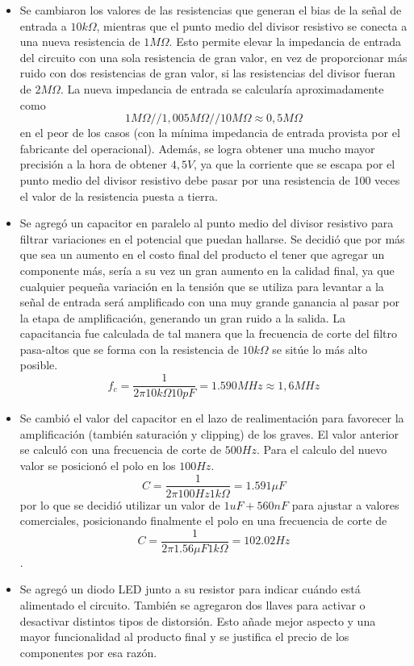\begin{itemize}
\item Se cambiaron los valores de las resistencias que generan el bias de la señal de entrada a $10k\Omega$, mientras que el punto medio del divisor resistivo se conecta a una nueva resistencia de $1M\Omega$. Esto permite elevar la impedancia de entrada del circuito con una sola resistencia de gran valor, en vez de proporcionar más ruido con dos resistencias de gran valor, si las resistencias del divisor fueran de $2M\Omega$. La nueva impedancia de entrada se calcularía aproximadamente como $$ 1M\Omega//1,005M\Omega//10M\Omega \approx 0,5M\Omega$$ en el peor de los casos (con la mínima impedancia de entrada provista por el fabricante del operacional).
Además, se logra obtener una mucho mayor precisión a la hora de obtener $4,5V$, ya que la corriente que se escapa por el punto medio del divisor resistivo debe pasar por una resistencia de 100 veces el valor de la resistencia puesta a tierra.
\item Se agregó un capacitor en paralelo al punto medio del divisor resistivo para filtrar variaciones en el potencial que puedan hallarse. Se decidió que por más que sea un aumento en el costo final del producto el tener que agregar un componente más, sería a su vez un gran aumento en la calidad final, ya que cualquier pequeña variación en la tensión que se utiliza para levantar a la señal de entrada será amplificado con una muy grande ganancia al pasar por la etapa de amplificación, generando un gran ruido a la salida. La capacitancia fue calculada de tal manera que la frecuencia de corte del filtro pasa-altos que se forma con la resistencia de $10k\Omega$ se sitúe lo más alto posible. $$ f_c = \frac{1}{2\pi 10k\Omega 10pF} = 1.590MHz \approx 1,6MHz$$
\item Se cambió el valor del capacitor en el lazo de realimentación para favorecer la amplificación (también saturación y clipping) de los graves. El valor anterior se calculó con una frecuencia de corte de $500Hz$. Para el calculo del nuevo valor se posicionó el polo en los $100Hz$. $$C = \frac{1}{2\pi 100Hz 1k\Omega} = 1.591\mu F$$ por lo que se decidió utilizar un valor de $1uF + 560nF$ para ajustar a valores comerciales, posicionando finalmente el polo en una frecuencia de corte de  $$C = \frac{1}{2\pi 1.56\mu F 1k\Omega} = 102.02Hz$$.
\item Se agregó un diodo LED junto a su resistor para indicar cuándo está alimentado el circuito. También se agregaron dos llaves para activar o desactivar distintos tipos de distorsión. Esto añade mejor aspecto y una mayor funcionalidad al producto final y se justifica el precio de los componentes por esa razón.

\end{itemize}

